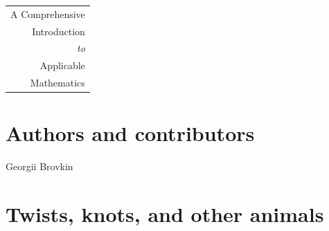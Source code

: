 \documentclass{book}
\theoremstyle{definition}
\theoremstyle{plain}
\begin{document}
\begin{titlepage}
  \centering
  \fontsize{2cm}{2.3cm}\selectfont
  \bfseries

  \begin{tabular}{@{\hskip -40pt}r@{}}
	A Comprehensive \\
	Introduction \\
	\it to \\
	Applicable \\
	Mathematics
  \end{tabular}

  \vspace*{\fill}
\end{titlepage}

\chapter*{Authors and contributors}
\thispagestyle{empty}    %

{\sl

\fontsize{0.5cm}{0.5cm}\selectfont

Georgii Brovkin

}

\vfill

\frontmatter

\setcounter{tocdepth}{1} %
\tableofcontents


\mainmatter


\chapter{Twists, knots, and other animals}

\end{document}
